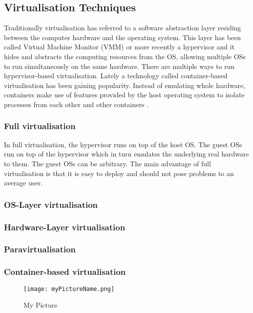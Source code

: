 \subsection{Virtualisation Techniques}

Traditionally virtualisation has referred to a software abstraction layer residing between the computer hardware and the operating system. \cite{taxonomy} This layer has been called Virtual Machine Monitor (VMM) or more recently a hypervisor and it hides and abstracts the computing resources from the OS, allowing multiple OSs to run simultaneously on the same hardware. There are multiple ways to run hypervisor-based virtualisation. Lately a technology called container-based virtualisation has been gaining popularity. Instead of emulating whole hardware, containers make use of features provided by the host operating system to isolate processes from each other and other containers \cite{eder2016hypervisor}.

\subsubsection{Full virtualisation}

In full virtualisation, the hypervisor runs on top of the host OS. The guest OSs run on top of the hypervisor which in turn emulates the underlying real hardware to them. The guest OSs can be arbitrary. The main advantage of full virtualisation is that it is easy to deploy and should not pose problems to an average user. 

\subsubsection{OS-Layer virtualisation}

\subsubsection{Hardware-Layer virtualisation}

\subsubsection{Paravirtualisation}

\subsubsection{Container-based virtualisation}

\begin{figure}
\centering
  \texttt{[image: myPictureName.png]}%
  \caption{My Picture}
\end{figure}